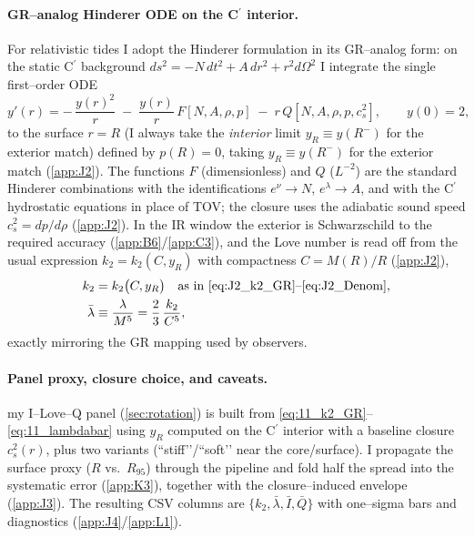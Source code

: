\documentclass{iopjournal}
\begin{document}
\paragraph{GR–analog Hinderer ODE on the C$^\prime$ interior.}
For relativistic tides I adopt the Hinderer formulation \cite{Hinderer2008,BinningtonPoisson2009,DamourNagar2009} in its GR–analog form: on the static C$^\prime$ background $ds^2=-N\,dt^2+A\,dr^2+r^2d\Omega^2$ I integrate the single first–order ODE
\begin{equation}
y'(r)= -\,\frac{y(r)^2}{r} \;-\; \frac{y(r)}{r}\,F[N,A,\rho,p]
\;-\; r\,Q[N,A,\rho,p,c_s^2],
\qquad y(0)=2,
\label{eq:11_yODE}
\end{equation}
to the surface $r=R$ (I always take the \emph{interior} limit $y_R\equiv y(R^-)$ for the exterior match) defined by $p(R)=0$, taking $y_R\equiv y(R^-)$ for the exterior match (\cref{app:J2}). The functions $F$ (dimensionless) and $Q$ ($L^{-2}$) are the standard Hinderer combinations with the identifications $e^{\nu}\!\to N$, $e^{\lambda}\!\to A$, and with the C$^\prime$ hydrostatic equations in place of TOV; the closure uses the adiabatic sound speed $c_s^2=dp/d\rho$ (\cref{app:J2}). In the IR window the exterior is Schwarzschild to the required accuracy (\cref{app:B6}/\cref{app:C3}), and the Love number is read off from the usual expression $k_2=k_2(C,y_R)$ with compactness $C=M(R)/R$ (\cref{app:J2}),
\begin{align}
k_2 &= k_2\big(C,y_R\big)\quad\text{as in \eqref{eq:J2_k2_GR}–\eqref{eq:J2_Denom}},\label{eq:11_k2_GR}\\
\bar\lambda&\equiv\frac{\lambda}{M^5}=\frac{2}{3}\,\frac{k_2}{C^5},\label{eq:11_lambdabar}
\end{align}
exactly mirroring the GR mapping used by observers.

\paragraph{Panel proxy, closure choice, and caveats.}
my I–Love–Q panel (\cref{sec:rotation}) is built from \eqref{eq:11_k2_GR}–\eqref{eq:11_lambdabar} using $y_R$ computed on the C$^\prime$ interior with a baseline closure $c_s^2(r)$, plus two variants (``stiff’’/``soft’’ near the core/surface). I propagate the surface proxy ($R$ vs.\ $R_{95}$) through the pipeline and fold half the spread into the systematic error (\cref{app:K3}), together with the closure–induced envelope (\cref{app:J3}). The resulting CSV columns are $\{k_2,\bar\lambda,\bar{I},\bar{Q}\}$ with one–sigma bars and diagnostics (\cref{app:J4}/\cref{app:L1}).
\end{document}
